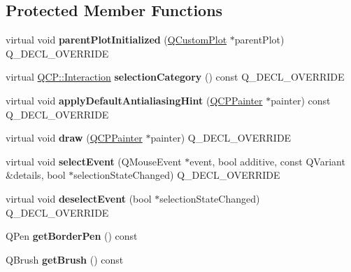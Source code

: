 \subsection*{Protected Member Functions}
\begin{DoxyCompactItemize}
\item 
\mbox{\label{class_q_c_p_legend_a2b225cefb5eb267771e2c7c44fd2b408}} 
virtual void {\bfseries parent\+Plot\+Initialized} (\mbox{\hyperlink{class_q_custom_plot}{Q\+Custom\+Plot}} $\ast$parent\+Plot) Q\+\_\+\+D\+E\+C\+L\+\_\+\+O\+V\+E\+R\+R\+I\+DE
\item 
\mbox{\label{class_q_c_p_legend_a1a2075e462984f9ff51d9c75bda3581b}} 
virtual \mbox{\hyperlink{namespace_q_c_p_a2ad6bb6281c7c2d593d4277b44c2b037}{Q\+C\+P\+::\+Interaction}} {\bfseries selection\+Category} () const Q\+\_\+\+D\+E\+C\+L\+\_\+\+O\+V\+E\+R\+R\+I\+DE
\item 
\mbox{\label{class_q_c_p_legend_a817f75c234f82a2e26643dc0de742095}} 
virtual void {\bfseries apply\+Default\+Antialiasing\+Hint} (\mbox{\hyperlink{class_q_c_p_painter}{Q\+C\+P\+Painter}} $\ast$painter) const Q\+\_\+\+D\+E\+C\+L\+\_\+\+O\+V\+E\+R\+R\+I\+DE
\item 
\mbox{\label{class_q_c_p_legend_a74f93358d2b4a76ec95c3a5d825582a3}} 
virtual void {\bfseries draw} (\mbox{\hyperlink{class_q_c_p_painter}{Q\+C\+P\+Painter}} $\ast$painter) Q\+\_\+\+D\+E\+C\+L\+\_\+\+O\+V\+E\+R\+R\+I\+DE
\item 
\mbox{\label{class_q_c_p_legend_a71f54a05c3e5b1a1ade1864422cd642e}} 
virtual void {\bfseries select\+Event} (Q\+Mouse\+Event $\ast$event, bool additive, const Q\+Variant \&details, bool $\ast$selection\+State\+Changed) Q\+\_\+\+D\+E\+C\+L\+\_\+\+O\+V\+E\+R\+R\+I\+DE
\item 
\mbox{\label{class_q_c_p_legend_ac2066837f7ebc32a5b15434cdca5b176}} 
virtual void {\bfseries deselect\+Event} (bool $\ast$selection\+State\+Changed) Q\+\_\+\+D\+E\+C\+L\+\_\+\+O\+V\+E\+R\+R\+I\+DE
\item 
\mbox{\label{class_q_c_p_legend_a1cf9df6f2130c5ad842dc92188ab6bd7}} 
Q\+Pen {\bfseries get\+Border\+Pen} () const
\item 
\mbox{\label{class_q_c_p_legend_ab1438d5d67304cdda3b9339da580d6bc}} 
Q\+Brush {\bfseries get\+Brush} () const
\end{DoxyCompactItemize}
